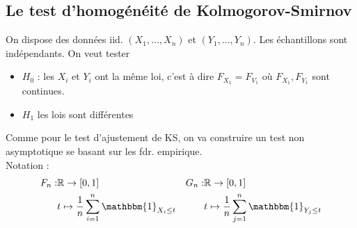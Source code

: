 \documentclass{article}
\theoremstyle{plain}%
\theoremstyle{definition}
\theoremstyle{remark}
\begin{document}
\subsection{Le test d'homogénéité de Kolmogorov-Smirnov}
On dispose des données iid. $ (X_1, \dots, X_n) $ et $ (Y_1, \dots, Y_n) $. Les échantillons sont indépendants. On veut tester
\begin{itemize}
    \item $ H_0 $ : les $ X_i $ et $ Y_i $ ont la même loi, c'est à dire $ F_{X_1} = F_{V_1} $ où $ F_{X_1}, F_{Y_1} $ sont continues.
    \item $ H_1 $ les lois sont différentes
\end{itemize}
Comme pour le test d'ajustement de KS, on va construire un test non asymptotique se basant sur les fdr. empirique.\\
Notation : 
\begin{align*}
    F_n : &\mathbb{R} \to [0,1] & G_n: &\mathbb{R} \to [0,1] \\
        & t \mapsto \frac{1}{n}\sum_{i=1}^{n}\mathbbm{1}_{X_i \leq t} & & t \mapsto \frac{1}{n}\sum_{j=1}^{n} \mathbbm{1}_{Y_j \leq t}
\end{align*}
\end{document}
